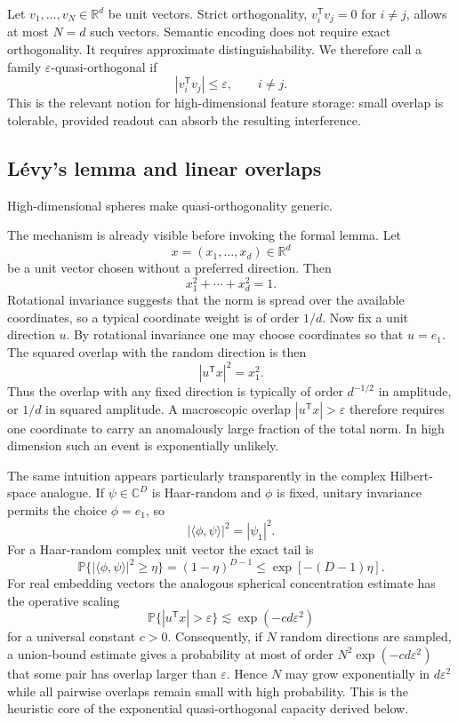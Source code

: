 \documentclass[
  aps,
  reprint,
  superscriptaddress,
  floatfix,
  nofootinbib,
  longbibliography
]{revtex4-2}
\newcommand{\R}{\mathbb{R}}
\newcommand{\Prob}{\mathbb{P}}
\newcommand{\T}{^{\mathsf{T}}}
\begin{document}
Let $v_{1},\dots,v_{N}\in\R^{d}$ be unit vectors. Strict orthogonality,
$v_i\T v_j=0$ for $i\neq j$, allows at most $N=d$ such vectors. Semantic
encoding does not require exact orthogonality. It requires approximate
distinguishability. We therefore call a family
$\varepsilon$-quasi-orthogonal if
%
\begin{equation}
\label{eq:quasiortho}
|v_i\T v_j|\le \varepsilon,\qquad i\neq j .
\end{equation}
%
This is the relevant notion for high-dimensional feature storage:
small overlap is tolerable, provided readout can absorb the resulting
interference.

\subsection{L\'evy's lemma and linear overlaps}
\label{sec:levy}

High-dimensional spheres make quasi-orthogonality generic.

The mechanism is already visible before invoking the formal lemma.  Let
\[
        x=(x_1,\ldots,x_d)\in\R^d
\]
be a unit vector chosen without a preferred direction.  Then
\[
        x_1^2+\cdots+x_d^2=1 .
\]
Rotational invariance suggests that the norm is spread over the available
coordinates, so a typical coordinate weight is of order $1/d$.  Now fix a
unit direction $u$.  By rotational invariance one may choose coordinates so
that $u=e_1$.  The squared overlap with the random direction is then
\[
        |u\T x|^2=x_1^2 .
\]
Thus the overlap with any fixed direction is typically of order $d^{-1/2}$
in amplitude, or $1/d$ in squared amplitude.  A macroscopic overlap
$|u\T x|>\varepsilon$ therefore requires one coordinate to carry an
anomalously large fraction of the total norm.  In high dimension such an
event is exponentially unlikely.

The same intuition appears particularly transparently in the complex
Hilbert-space analogue.  If $\psi\in\mathbb{C}^D$ is Haar-random and
$\phi$ is fixed, unitary invariance permits the choice $\phi=e_1$, so
\[
        |\langle\phi,\psi\rangle|^2=|\psi_1|^2 .
\]
For a Haar-random complex unit vector the exact tail is
\[
        \Prob\{ |\langle\phi,\psi\rangle|^2\geq\eta\}
        =(1-\eta)^{D-1}
        \leq \exp[-(D-1)\eta] .
\]
For real embedding vectors the analogous spherical concentration estimate
has the operative scaling
\[
        \Prob\{ |u\T x|>\varepsilon\}
        \lesssim \exp(-c d\varepsilon^2)
\]
for a universal constant $c>0$.  Consequently, if $N$ random directions are
sampled, a union-bound estimate gives a probability at most of order
$N^2\exp(-c d\varepsilon^2)$ that some pair has overlap larger than
$\varepsilon$.  Hence $N$ may grow exponentially in $d\varepsilon^2$ while
all pairwise overlaps remain small with high probability.  This is the
heuristic core of the exponential quasi-orthogonal capacity derived below.
\end{document}
